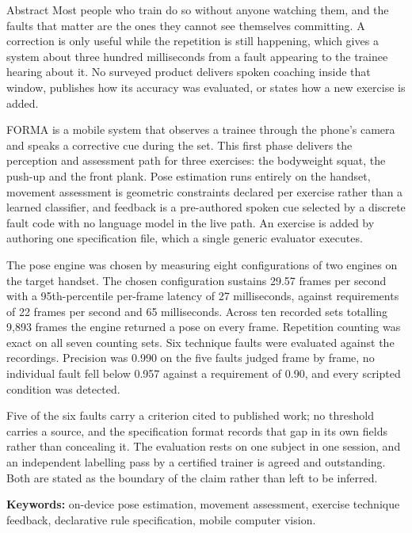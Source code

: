 \begin{preface}{Abstract}
  Most people who train do so without anyone watching them, and the faults
  that matter are the ones they cannot see themselves committing. A correction
  is only useful while the repetition is still happening, which gives a system
  about three hundred milliseconds from a fault appearing to the trainee
  hearing about it. No surveyed product delivers spoken coaching inside that
  window, publishes how its accuracy was evaluated, or states how a new
  exercise is added.

  FORMA is a mobile system that observes a trainee through the phone's camera
  and speaks a corrective cue during the set. This first phase delivers the
  perception and assessment path for three exercises: the bodyweight squat,
  the push-up and the front plank. Pose estimation runs entirely on the
  handset, movement assessment is geometric constraints declared per exercise
  rather than a learned classifier, and feedback is a pre-authored spoken cue
  selected by a discrete fault code with no language model in the live path.
  An exercise is added by authoring one specification file, which a single
  generic evaluator executes.

  The pose engine was chosen by measuring eight configurations of two engines
  on the target handset. The chosen configuration sustains 29.57 frames per
  second with a 95th-percentile per-frame latency of 27 milliseconds, against
  requirements of 22 frames per second and 65 milliseconds. Across ten
  recorded sets totalling 9,893 frames the engine returned a pose on every
  frame. Repetition counting was exact on all seven counting sets. Six
  technique faults were evaluated against the recordings. Precision was 0.990
  on the five faults judged frame by frame, no individual fault fell below
  0.957 against a requirement of 0.90, and every scripted condition was
  detected.

  Five of the six faults carry a criterion cited to published work; no
  threshold carries a source, and the specification format records that gap in
  its own fields rather than concealing it. The evaluation rests on one
  subject in one session, and an independent labelling pass by a certified
  trainer is agreed and outstanding. Both are stated as the boundary of the
  claim rather than left to be inferred.

  \vspace{1em}
  \noindent\textbf{Keywords:} on-device pose estimation, movement
  assessment, exercise technique feedback, declarative rule specification,
  mobile computer vision.
\end{preface}
